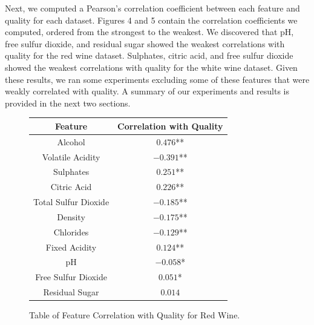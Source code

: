 \newpage

Next, we computed a Pearson's correlation coefficient between each feature and quality for each dataset. Figures 4 and 5 contain the correlation coefficients we computed, ordered from the strongest to the weakest. We discovered that pH, free sulfur dioxide, and residual sugar showed the weakest correlations with quality for the red wine dataset. Sulphates, citric acid, and free sulfur dioxide showed the weakest correlations with quality for the white wine dataset. Given these results, we ran some experiments excluding some of these features that were weakly correlated with quality. A summary of our experiments and results is provided in the next two sections.
\begin{figure}[htb]
  \centering %

 \begin{tabular}{|c|c|} 
   \hline \hline %
    Feature & Correlation with Quality \\ %
    \hline %
    Alcohol & $0.476$** \\
     \hline
    Volatile Acidity & $-0.391$** \\
     \hline
    Sulphates & $0.251$** \\
     \hline
    Citric Acid   & $0.226$** \\
     \hline
    Total Sulfur Dioxide  & $-0.185$** \\
     \hline
    Density  & $-0.175$** \\
     \hline
    Chlorides & $-0.129$** \\
     \hline
    Fixed Acidity  & $0.124$** \\
     \hline
    pH  & $-0.058$* \\
     \hline
    Free Sulfur Dioxide    & $0.051$* \\
     \hline
    Residual Sugar   & $0.014$ \\
  
    \hline \hline  
    \end{tabular}
  \caption{Table of Feature Correlation with Quality for Red Wine.}
  \label{tab:example}

\end{figure}

